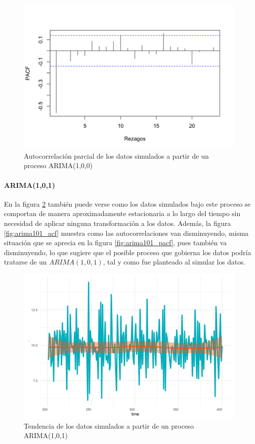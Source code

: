 \documentclass[
]{article}
\begin{document}
\begin{figure}[H]
\includegraphics[width=1\linewidth,height=1\textheight]{Tesis_files/figure-latex/arima100_pacf-1} \caption{Autocorrelación parcial de los datos simulados a partir de un proceso ARIMA(1,0,0)}\label{fig:arima100_pacf}
\end{figure}

\paragraph{ARIMA(1,0,1)}

En la figura \ref{fig:arima101_comportamiento} también puede verse como
los datos simulados bajo este proceso se comportan de manera
aproximadamente estacionaria a lo largo del tiempo sin necesidad de
aplicar ninguna transformación a los datos. Además, la figura
\ref{fig:arima101_acf} muestra como las autocorrelaciones van
disminuyendo, misma situación que se aprecia en la figura
\ref{fig:arima101_pacf}, pues también va disminuyendo, lo que sugiere
que el posible proceso que gobierna los datos podría tratarse de un
\(ARIMA(1,0,1)\), tal y como fue planteado al simular los datos.

\begin{figure}[H]
\includegraphics[width=1\linewidth,height=1\textheight]{Tesis_files/figure-latex/arima101_comportamiento-1} \caption{Tendencia de los datos simulados a partir de un proceso ARIMA(1,0,1)}\label{fig:arima101_comportamiento}
\end{figure}
\end{document}
